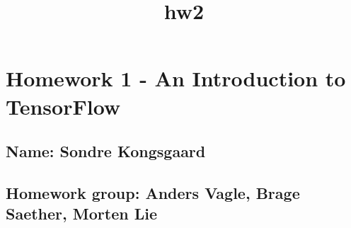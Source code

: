 \documentclass[11pt]{article}
\title{hw2}
\begin{document}
    
    
    \maketitle
    
    

    
    \section{Homework 1 - An Introduction to
TensorFlow}\label{homework-1---an-introduction-to-tensorflow}

\subsection{Name: Sondre Kongsgaard}\label{name-sondre-kongsgaard}

\subsection{Homework group: Anders Vagle, Brage Saether, Morten
Lie}\label{homework-group-anders-vagle-brage-saether-morten-lie}
\end{document}
